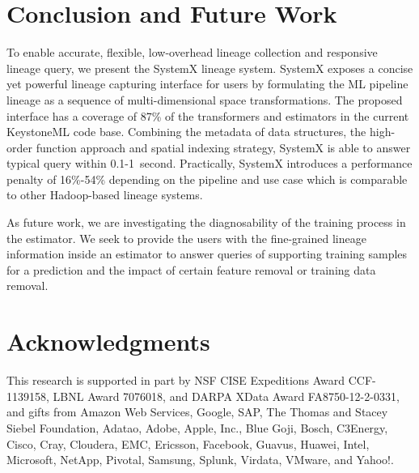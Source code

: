 \documentclass{sig-alternate}
\begin{document}
\section{Conclusion and Future Work}
\label{sec:Conclusion}
To enable accurate, flexible, low-overhead lineage collection and responsive lineage query, we present the SystemX lineage system.
SystemX exposes a concise yet powerful lineage capturing interface for users by formulating the ML pipeline lineage as a sequence
of multi-dimensional space transformations. The proposed interface has a coverage of 87\% of the transformers and estimators
in the current KeystoneML code base. Combining the metadata of data structures, the high-order function approach and spatial indexing
strategy, SystemX is able to answer typical query within 0.1-1~second. Practically, SystemX introduces a
performance penalty of 16\%-54\% depending on the pipeline and use case which is comparable to other Hadoop-based lineage systems.

As future work, we are investigating the diagnosability of the training process in the estimator. We seek to provide the users with
the fine-grained lineage information inside an estimator to answer queries of supporting training samples for
a prediction and the impact of certain feature removal or training data removal.

\section{Acknowledgments}
This research is supported in part by NSF CISE Expeditions Award CCF-1139158, LBNL Award 7076018, and DARPA XData Award FA8750-12-2-0331, and gifts from Amazon Web Services, Google, SAP,  The Thomas and Stacey Siebel Foundation, Adatao, Adobe, Apple, Inc., Blue Goji, Bosch, C3Energy, Cisco, Cray, Cloudera, EMC, Ericsson, Facebook, Guavus, Huawei, Intel, Microsoft, NetApp, Pivotal, Samsung, Splunk, Virdata, VMware, and Yahoo!. 

%

%
%



\balancecolumns

\end{document}
